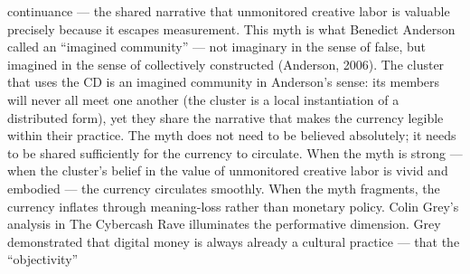 continuance — the shared narrative that unmonitored creative labor is valuable precisely because it escapes measurement. This myth is what Benedict Anderson called an “imagined community” — not imaginary in the sense of false, but imagined in the sense of collectively constructed (Anderson, 2006). The cluster that uses the CD is an imagined community in Anderson’s sense: its members will never all meet one another (the cluster is a local instantiation of a distributed form), yet they share the narrative that makes the currency legible within their practice. The myth does not need to be believed absolutely; it needs to be shared sufficiently for the currency to circulate. When the myth is strong — when the cluster’s belief in the value of unmonitored creative labor is vivid and embodied — the currency circulates smoothly. When the myth fragments, the currency inflates through meaning-loss rather than monetary policy. Colin Grey’s analysis in The Cybercash Rave illuminates the performative dimension. Grey demonstrated that digital money is always already a cultural practice — that the “objectivity”

